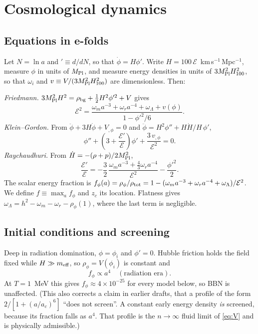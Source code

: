 \documentclass[11pt]{article}
\newcommand{\Mp}{M_{\rm Pl}}
\begin{document}
\section{Cosmological dynamics}\label{sec:cosmo}

\subsection{Equations in e-folds}
Let $N=\ln a$ and $'\equiv d/dN$, so that $\dot\phi=H\phi'$. Write
$H=100\,\mathcal{E}$~km\,s$^{-1}$\,Mpc$^{-1}$, measure $\phi$ in units of $\Mp$, and
measure energy densities in units of $3\Mp^2H_{100}^2$, so that
$\omega_i$ and $v\equiv V/(3\Mp^2H_{100}^2)$ are dimensionless. Then:

\noindent\emph{Friedmann.} $3\Mp^2H^2=\rho_{\rm bg}+\frac12H^2\phi'^2+V$ gives
\begin{equation}
\mathcal{E}^2=\frac{\omega_ma^{-3}+\omega_ra^{-4}+\omega_\Lambda+v(\phi)}{1-\phi'^2/6}.
\label{eq:friedmann}
\end{equation}
\emph{Klein--Gordon.} From $\ddot\phi+3H\dot\phi+V_{,\phi}=0$ and
$\ddot\phi=H^2\phi''+H\dot H/H\,\phi'$,
\begin{equation}
\phi''+\left(3+\frac{\mathcal{E}'}{\mathcal{E}}\right)\phi'+\frac{3\,v_{,\phi}}{\mathcal{E}^2}=0 .
\label{eq:kg}
\end{equation}
\emph{Raychaudhuri.} From $\dot H=-(\rho+p)/2\Mp^2$,
\begin{equation}
\frac{\mathcal{E}'}{\mathcal{E}}=-\frac32\,
\frac{\omega_ma^{-3}+\frac43\omega_ra^{-4}}{\mathcal{E}^2}-\frac{\phi'^2}{2}.
\label{eq:ray}
\end{equation}
The scalar energy fraction is $f_\phi(a)=\rho_\phi/\rho_{\rm tot}=1-(\omega_ma^{-3}+\omega_ra^{-4}+\omega_\Lambda)/\mathcal{E}^2$.
We define $f\equiv\max_af_\phi$ and $z_c$ its location. Flatness gives
$\omega_\Lambda=h^2-\omega_m-\omega_r-\rho_\phi(1)$, where the last term is negligible.

\subsection{Initial conditions and screening}
Deep in radiation domination, $\phi=\phi_i$ and $\phi'=0$. Hubble friction holds the field
fixed while $H\gg m_{\rm eff}$, so $\rho_\phi=V(\phi_i)$ is constant and
\begin{equation}
f_\phi\propto a^4\quad(\text{radiation era}).
\end{equation}
At $T=1$~MeV this gives $f_\phi\approx4\times10^{-25}$ for every model below, so BBN is
unaffected. (This also corrects a claim in earlier drafts, that a profile of the form
$2/[1+(a/a_c)^6]$ ``does not screen''. A constant early energy density \emph{is}
screened, because its fraction falls as $a^4$. That profile is the $n\to\infty$ fluid
limit of \eqref{eq:V} and is physically admissible.)
\end{document}
